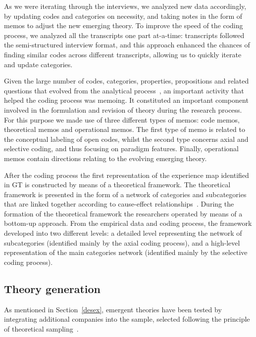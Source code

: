 \documentclass[10pt,journal,letterpaper,compsoc]{IEEEtran}
\begin{document}
As we were iterating through the interviews, we analyzed new data accordingly,
by updating codes and categories on necessity, and taking notes in the form of
memos to adjust the new emerging theory. To improve the speed of the coding
process, we analyzed all the transcripts one part at-a-time: transcripts
followed the semi-structured interview format, and this approach enhanced the
chances of finding similar codes across different transcripts, allowing us to
quickly iterate and update categories.

Given the large number of codes, categories, properties, propositions and
related questions that evolved from the analytical process~\cite{Corbin1990},
an important activity that helped the coding process was memoing. It constituted
an important component involved in the formulation and revision of theory
during the research process. For this purpose we made use of three different
types of memos: code memos, theoretical memos and operational memos. The first
type of memo is related to the conceptual labeling of open codes, whilst the
second type concerns axial and selective coding, and thus focusing on paradigm
features. Finally, operational memos contain directions relating to the evolving
emerging theory.

After the coding process the first representation of the experience map
identified in GT is constructed by means of a theoretical framework. The
theoretical framework is presented in the form of a network of categories and
subcategories that are linked together according to cause-effect 
relationships~\cite{Corbin1990}. During the formation of the theoretical 
framework the researchers operated by means of a bottom-up approach. From the 
empirical data and coding process, the framework developed into two different 
levels: a detailed level representing the network of subcategories (identified 
mainly by the axial coding process), and a high-level representation of the main
categories network (identified mainly by the selective coding process).

\subsection{Theory generation}

As mentioned in Section~\ref{desex}, emergent theories have been tested by
integrating additional companies into the sample, selected following the
principle of theoretical sampling~\cite{Yin1994}.
\end{document}
